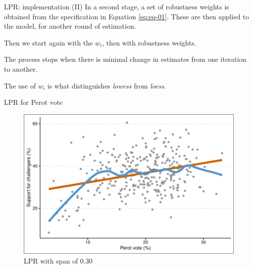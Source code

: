\documentclass[12pt,english,pdf,xcolor=dvipsnames,aspectratio=169,handout]{beamer}\usepackage[]{graphicx}\usepackage[]{xcolor}
\begin{document}
\begin{frame}{LPR: implementation (II)}
  In a second stage, a set of robustness weights is obtained from the specification in Equation \ref{eq:eq-01}. These are then applied to the model, for another round of estimation.\bigskip

  Then we start again with the $w_i$, then with robustness weights.\bigskip

  The process stops when there is minimal change in estimates from one iteration to another.\bigskip

  The use of $w_i$ is what distinguishes \textit{lowess} from \textit{loess}.
\end{frame}



\begin{frame}{LPR for Perot vote}



\begin{figure}
  \centering
  \includegraphics[scale=0.7]{../04-graphs/04-07a}
  \caption{LPR with span of 0.30}
\end{figure}

\end{frame}
\end{document}
